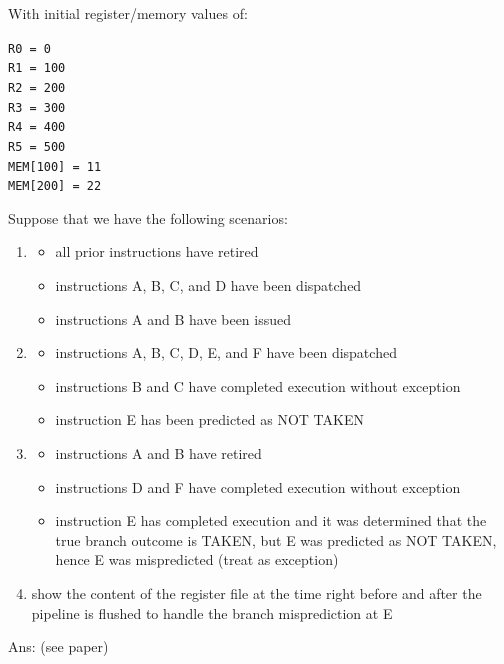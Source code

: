 \documentclass[12pt]{article}
\begin{document}
\begin{enumerate}
        With initial register/memory values of:

        \texttt{R0 = 0}\\
        \texttt{R1 = 100}\\
        \texttt{R2 = 200}\\
        \texttt{R3 = 300}\\
        \texttt{R4 = 400}\\
        \texttt{R5 = 500}\\
        \texttt{MEM[100] = 11}\\
        \texttt{MEM[200] = 22}

        Suppose that we have the following scenarios:

        \begin{enumerate}
            \item
            \begin{itemize}
                \item all prior instructions have retired
                \item instructions A, B, C, and D have been dispatched
                \item instructions A and B have been issued
            \end{itemize}

            \item
            \begin{itemize}
                \item instructions A, B, C, D, E, and F have been dispatched
                \item instructions B and C have completed execution without exception
                \item instruction E has been predicted as NOT TAKEN
            \end{itemize}

            \item
            \begin{itemize}
                \item instructions A and B have retired
                \item instructions D and F have completed execution without exception
                \item instruction E has completed execution and it was determined that the true branch outcome is TAKEN, 
                but E was predicted as NOT TAKEN, hence E was mispredicted (treat as exception)
            \end{itemize}

            \item show the content of the register file at the time right before and after the pipeline is 
            flushed to handle the branch misprediction at E
        \end{enumerate}

        Ans: (see paper)

    \end{enumerate}
\end{document}
